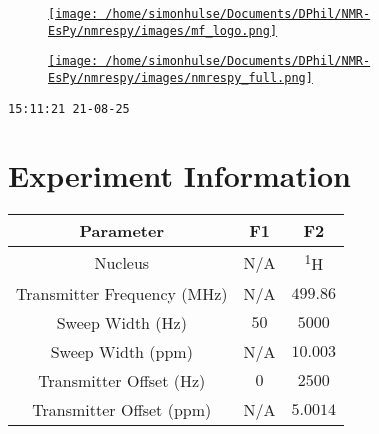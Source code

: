 \documentclass[8pt]{article}
\begin{document}
\begin{figure}[!ht]
\begin{minipage}[b][2.5cm][c]{.72\textwidth}
\href{http://foroozandeh.chem.ox.ac.uk/home}%
{\texttt{[image: /home/simonhulse/Documents/DPhil/NMR-EsPy/nmrespy/images/mf\_logo.png]}}
\end{minipage}
\begin{minipage}[b][2.5cm][c]{.27\textwidth}
\href{https://foroozandehgroup.github.io/NMR-EsPy}%
{\texttt{[image: /home/simonhulse/Documents/DPhil/NMR-EsPy/nmrespy/images/nmrespy\_full.png]}}
\end{minipage}
\end{figure}
\texttt{15:11:21 21-08-25}



\section*{Experiment Information}
\begin{longtable}[l]{c c c}
\toprule
Parameter & F1 & F2\\
\midrule
Nucleus & N/A & \textsuperscript{1}H\\
Transmitter Frequency (MHz) & N/A & $\num{499.86}$\\
Sweep Width (Hz) & $\num{50}$ & $\num{5000}$\\
Sweep Width (ppm) & N/A & $\num{10.003}$\\
Transmitter Offset (Hz) & $\num{0}$ & $\num{2500}$\\
Transmitter Offset (ppm) & N/A & $\num{5.0014}$\\
\bottomrule
\end{longtable}
\end{document}
